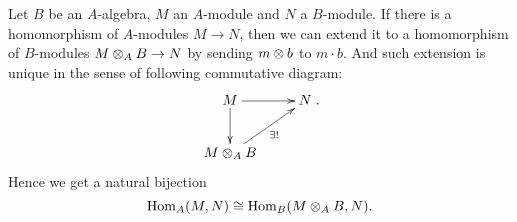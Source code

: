     \begin{remark}\label{rmk: extending homomorphisms (M to N) to tensor products (M ten B to N)}
        Let $B$ be an $A$-algebra, $M$ an \(A\)-module and \(N\) a \(B\)-module.
        If there is a homomorphism of \(A\)-modules \(M \to N\), then we can extend it to a homomorphism of \(B\)-modules \(M \otimes_A B \to N\) by sending \(m \otimes b\) to \(m \cdot b\).
        And such extension is unique in the sense of following commutative diagram:
        \[
            \xymatrix{
                M \ar[r] \ar[d] & N \\
                M \ten_A B \ar[ru]_{\exists!} & 
            }.
        \]
        Hence we get a natural bijection 
        \[ \operatorname{Hom}_A(M, N) \cong \operatorname{Hom}_B(M \otimes_A B, N). \]
    \end{remark}

    
    


